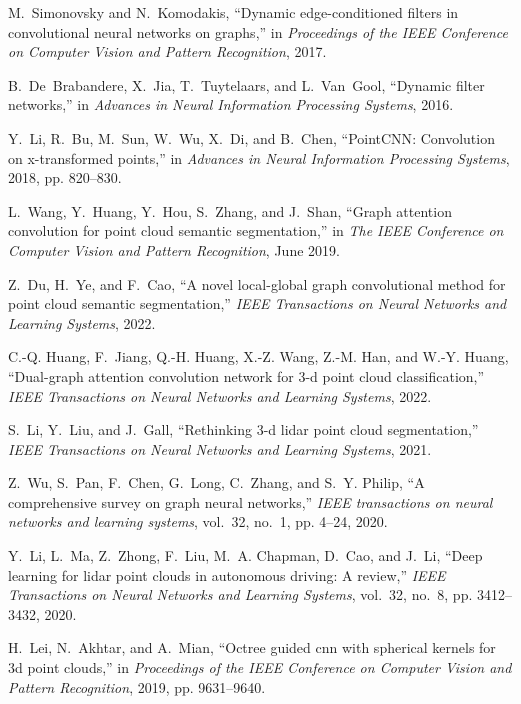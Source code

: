 \begin{thebibliography}{1}
M.~Simonovsky and N.~Komodakis, ``Dynamic edge-conditioned filters in
  convolutional neural networks on graphs,'' in \emph{Proceedings of the IEEE
  Conference on Computer Vision and Pattern Recognition}, 2017.

B.~De~Brabandere, X.~Jia, T.~Tuytelaars, and L.~Van~Gool, ``Dynamic filter
  networks,'' in \emph{Advances in Neural Information Processing Systems},
  2016.

Y.~Li, R.~Bu, M.~Sun, W.~Wu, X.~Di, and B.~Chen, ``Point{CNN}: Convolution on
  x-transformed points,'' in \emph{Advances in Neural Information Processing
  Systems}, 2018, pp. 820--830.

L.~Wang, Y.~Huang, Y.~Hou, S.~Zhang, and J.~Shan, ``Graph attention convolution
  for point cloud semantic segmentation,'' in \emph{The IEEE Conference on
  Computer Vision and Pattern Recognition}, June 2019.

Z.~Du, H.~Ye, and F.~Cao, ``A novel local-global graph convolutional method for
  point cloud semantic segmentation,'' \emph{IEEE Transactions on Neural
  Networks and Learning Systems}, 2022.

C.-Q. Huang, F.~Jiang, Q.-H. Huang, X.-Z. Wang, Z.-M. Han, and W.-Y. Huang,
  ``Dual-graph attention convolution network for 3-d point cloud
  classification,'' \emph{IEEE Transactions on Neural Networks and Learning
  Systems}, 2022.

S.~Li, Y.~Liu, and J.~Gall, ``Rethinking 3-d lidar point cloud segmentation,''
  \emph{IEEE Transactions on Neural Networks and Learning Systems}, 2021.

Z.~Wu, S.~Pan, F.~Chen, G.~Long, C.~Zhang, and S.~Y. Philip, ``A comprehensive
  survey on graph neural networks,'' \emph{IEEE transactions on neural networks
  and learning systems}, vol.~32, no.~1, pp. 4--24, 2020.

Y.~Li, L.~Ma, Z.~Zhong, F.~Liu, M.~A. Chapman, D.~Cao, and J.~Li, ``Deep
  learning for lidar point clouds in autonomous driving: A review,'' \emph{IEEE
  Transactions on Neural Networks and Learning Systems}, vol.~32, no.~8, pp.
  3412--3432, 2020.

H.~Lei, N.~Akhtar, and A.~Mian, ``Octree guided cnn with spherical kernels for
  3d point clouds,'' in \emph{Proceedings of the IEEE Conference on Computer
  Vision and Pattern Recognition}, 2019, pp. 9631--9640.


\end{thebibliography}
